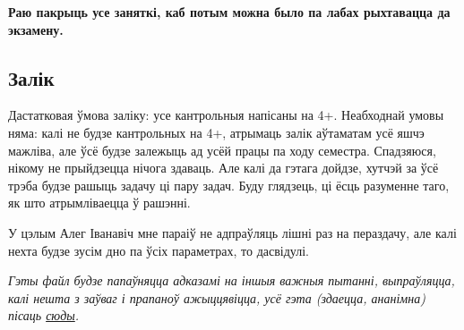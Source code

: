 \documentclass[12pt, a4paper]{extarticle}
\begin{document}
    \textbf{Раю пакрыць усе заняткі, каб потым можна было па лабах рыхтавацца да экзамену.}

    \subsection{Залік}
    Дастатковая ўмова заліку: усе кантрольныя напісаны на 4+. Неабходнай умовы няма: калі не будзе кантрольных на 4+, атрымаць залік аўтаматам усё яшчэ мажліва, але ўсё будзе залежыць ад усёй працы па ходу семестра. Спадзяюся, нікому не прыйдзецца нічога здаваць. Але калі да гэтага дойдзе, хутчэй за ўсё трэба будзе рашыць задачу ці пару задач. Буду глядзець, ці ёсць разуменне таго, як што атрымліваецца ў рашэнні. 

    У цэлым Алег Іванавіч мне параіў не адпраўляць лішні раз на пераздачу, але калі нехта будзе зусім дно па ўсіх параметрах, то дасвідулі.

    \bigskip

    \textit{Гэты файл будзе папаўняцца адказамі на іншыя важныя пытанні, выпраўляцца, калі нешта з заўваг і прапаноў ажыццявіцца, усё гэта (здаецца, ананімна) пісаць \href{https://docs.google.com/document/d/1La38_lqT7PtdRVmlvKIVh_7rIWvHqPBFG7yrWFoKkFM/edit?usp=sharing}{сюды}.}
\end{document}
